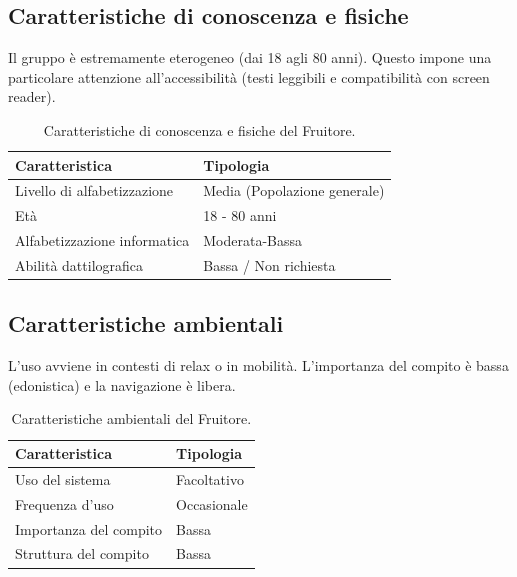 \subsection{Caratteristiche di conoscenza e fisiche}
Il gruppo è estremamente eterogeneo (dai 18 agli 80 anni). Questo impone una particolare attenzione all'accessibilità (testi leggibili e compatibilità con screen reader).

\begin{table}[H]
\centering
\begin{tabular}{|l|l|}
\hline
\textbf{Caratteristica} & \textbf{Tipologia} \\ \hline
Livello di alfabetizzazione & Media (Popolazione generale) \\ \hline
Età & 18 - 80 anni \\ \hline
Alfabetizzazione informatica & Moderata-Bassa \\ \hline
Abilità dattilografica & Bassa / Non richiesta \\ \hline
\end{tabular}
\caption{Caratteristiche di conoscenza e fisiche del Fruitore.}
\label{tab:fruit_conoscenze_fisiche}
\end{table}

\subsection{Caratteristiche ambientali}
L'uso avviene in contesti di relax o in mobilità. L'importanza del compito è bassa (edonistica) e la navigazione è libera.

\begin{table}[H]
\centering
\begin{tabular}{|l|l|}
\hline
\textbf{Caratteristica} & \textbf{Tipologia} \\ \hline
Uso del sistema & Facoltativo \\ \hline
Frequenza d'uso & Occasionale \\ \hline
Importanza del compito & Bassa \\ \hline
Struttura del compito & Bassa \\ \hline
\end{tabular}
\caption{Caratteristiche ambientali del Fruitore.}
\label{tab:fruit_ambientali}
\end{table}

